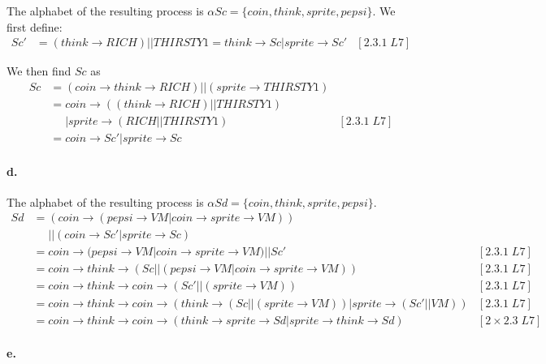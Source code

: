 \documentclass[a4paper, 11pt]{article}
\begin{document}
The alphabet of the resulting process is $\alpha Sc = \{coin, think, sprite, pepsi\}$. We first define:
\begin{align*}
Sc' &= (think \rightarrow RICH) || THIRSTY1 = think \rightarrow Sc | sprite \rightarrow Sc' & [2.3.1\;L7]
\end{align*}

We then find $Sc$ as
\begin{align*}
Sc &= (coin \rightarrow think \rightarrow RICH) || (sprite \rightarrow THIRSTY1) \\
   &= coin \rightarrow ((think \rightarrow RICH) || THIRSTY1) \\
   &\phantom{=} | sprite \rightarrow (RICH || THIRSTY1) & [2.3.1\;L7] \\
   &= coin \rightarrow Sc' | sprite \rightarrow Sc 
\end{align*}


\paragraph{d.} %
\label{par:d_}

The alphabet of the resulting process is $\alpha Sd = \{coin, think, sprite, pepsi \}$.
\begin{align*}
Sd &= (coin \rightarrow (pepsi \rightarrow VM | coin \rightarrow sprite \rightarrow VM)) \\
   &\phantom{=} || (coin \rightarrow Sc' | sprite \rightarrow Sc) \\
   &= coin \rightarrow (pepsi \rightarrow VM | coin \rightarrow sprite \rightarrow VM) || Sc' & [2.3.1\;L7] \\
   &= coin \rightarrow think \rightarrow (Sc || (pepsi \rightarrow VM | coin \rightarrow sprite \rightarrow VM)) & [2.3.1\;L7] \\
   &= coin \rightarrow think \rightarrow coin \rightarrow (Sc' || (sprite \rightarrow VM)) & [2.3.1\;L7] \\
   &= coin \rightarrow think \rightarrow coin \rightarrow (think \rightarrow (Sc || (sprite \rightarrow VM)) | sprite \rightarrow (Sc' || VM)) & [2.3.1\;L7] \\
   &= coin \rightarrow think \rightarrow coin \rightarrow (think \rightarrow sprite \rightarrow Sd | sprite \rightarrow think \rightarrow Sd) & [2 \times 2.3\;L7]
\end{align*}


\paragraph{e.} %
\label{par:e_}
\end{document}
